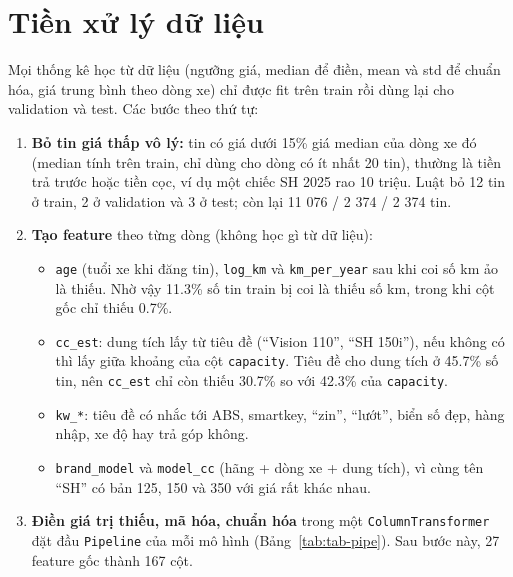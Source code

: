 \section{Tiền xử lý dữ liệu}\label{sec:tab-prep}

Mọi thống kê học từ dữ liệu (ngưỡng giá, median để điền, mean và std để chuẩn hóa, giá trung bình theo dòng xe) chỉ được
fit trên train rồi dùng lại cho validation và test. Các bước theo thứ tự:

\begin{enumerate}
  \item \textbf{Bỏ tin giá thấp vô lý:} tin có giá dưới 15\% giá median của dòng xe đó (median tính trên train, chỉ dùng
        cho dòng có ít nhất 20 tin), thường là tiền trả trước hoặc tiền cọc, ví dụ một chiếc SH 2025 rao 10 triệu. Luật
        bỏ 12 tin ở train, 2 ở validation và 3 ở test; còn lại 11 076 / 2 374 / 2 374 tin.
  \item \textbf{Tạo feature} theo từng dòng (không học gì từ dữ liệu):
  \begin{itemize}
    \item \texttt{age} (tuổi xe khi đăng tin), \texttt{log\_km} và \texttt{km\_per\_year} sau khi coi số km ảo là thiếu.
          Nhờ vậy 11.3\% số tin train bị coi là thiếu số km, trong khi cột gốc chỉ thiếu 0.7\%.
    \item \texttt{cc\_est}: dung tích lấy từ tiêu đề (``Vision 110'', ``SH 150i''), nếu không có thì lấy giữa khoảng của
          cột \texttt{capacity}. Tiêu đề cho dung tích ở 45.7\% số tin, nên \texttt{cc\_est} chỉ còn thiếu 30.7\% so
          với 42.3\% của \texttt{capacity}.
    \item \texttt{kw\_*}: tiêu đề có nhắc tới ABS, smartkey, ``zin'', ``lướt'', biển số đẹp, hàng nhập, xe độ hay trả
          góp không.
    \item \texttt{brand\_model} và \texttt{model\_cc} (hãng + dòng xe + dung tích), vì cùng tên ``SH'' có bản 125, 150
          và 350 với giá rất khác nhau.
  \end{itemize}
  \item \textbf{Điền giá trị thiếu, mã hóa, chuẩn hóa} trong một \texttt{ColumnTransformer} đặt đầu \texttt{Pipeline}
        của mỗi mô hình (Bảng~\ref{tab:tab-pipe}). Sau bước này, 27 feature gốc thành 167 cột.
\end{enumerate}

